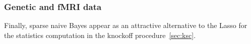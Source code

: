 \subsubsection{Genetic and fMRI data}\label{subsubsec:snb_genetic_fmri}

\bigbreak
Finally, sparse naive Bayes appear as an attractive alternative to the Lasso for the statistics computation
in the knockoff procedure~\ref{sec:ksc}.
